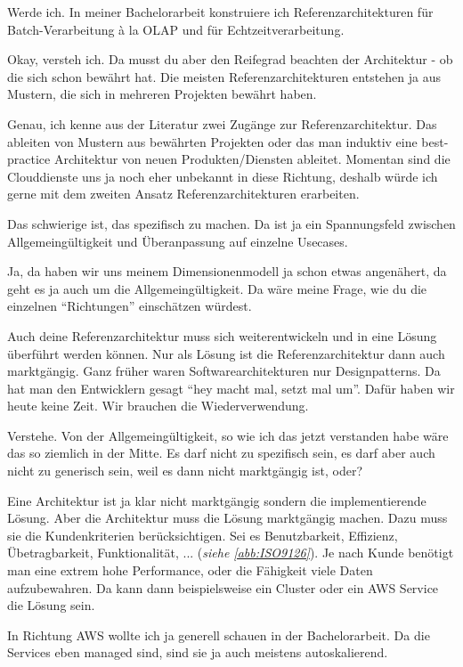 \LF Werde ich. In meiner Bachelorarbeit konstruiere ich Referenzarchitekturen für Batch-Verarbeitung \`{a} la \ac{OLAP} und für Echtzeitverarbeitung.

\RB Okay, versteh ich. Da musst du aber den Reifegrad beachten der Architektur - ob die sich schon bewährt hat. Die meisten Referenzarchitekturen entstehen ja aus Mustern, die sich in mehreren Projekten bewährt haben.

\LF Genau, ich kenne aus der Literatur zwei Zugänge zur Referenzarchitektur. Das ableiten von Mustern aus bewährten Projekten oder das man induktiv eine best-practice Architektur von neuen Produkten/Diensten ableitet. Momentan sind die Clouddienste uns ja noch eher unbekannt in diese Richtung, deshalb würde ich gerne mit dem zweiten Ansatz Referenzarchitekturen erarbeiten.

\RB Das schwierige ist, das spezifisch zu machen. Da ist ja ein Spannungsfeld zwischen Allgemeingültigkeit und Überanpassung auf einzelne Usecases.

\LF Ja, da haben wir uns meinem Dimensionenmodell ja schon etwas angenähert, da geht es ja auch um die Allgemeingültigkeit. Da wäre meine Frage, wie du die einzelnen \enquote{Richtungen} einschätzen würdest.

\RB Auch deine Referenzarchitektur muss sich weiterentwickeln und in eine Lösung überführt werden können. Nur als Lösung ist die Referenzarchitektur dann auch marktgängig. Ganz früher waren Softwarearchitekturen nur Designpatterns. Da hat man den Entwicklern gesagt \enquote{hey macht mal, setzt mal um}. Dafür haben wir heute keine Zeit. Wir brauchen die Wiederverwendung. 

\LF Verstehe. Von der Allgemeingültigkeit, so wie ich das jetzt verstanden habe wäre das so ziemlich in der Mitte. Es darf nicht zu spezifisch sein, es darf aber auch nicht zu generisch sein, weil es dann nicht marktgängig ist, oder?

\RB Eine Architektur ist ja klar nicht marktgängig sondern die implementierende Lösung. Aber die Architektur muss die Lösung marktgängig machen. Dazu muss sie die Kundenkriterien berücksichtigen. Sei es Benutzbarkeit, Effizienz, Übetragbarkeit, Funktionalität, ... (\textit{siehe \autoref{abb:ISO9126}}). Je nach Kunde benötigt man eine extrem hohe Performance, oder die Fähigkeit viele Daten aufzubewahren. Da kann dann beispielsweise ein Cluster oder ein \ac{AWS} Service die Lösung sein.

\LF In Richtung \ac{AWS} wollte ich ja generell schauen in der Bachelorarbeit. Da die Services eben managed sind, sind sie ja auch meistens autoskalierend.

